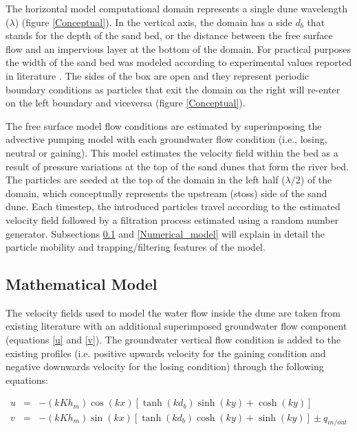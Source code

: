 \documentclass[draft,linenumbers]{agujournal2018}
\begin{document}
The horizontal model computational domain represents a single dune wavelength ($\lambda$) (figure \ref{Conceptual}). In the vertical axis, the domain has a side $d_b$ that stands for the depth of the sand bed, or the distance between the free surface flow and an impervious layer at the bottom of the domain. For practical purposes the width of the sand bed was modeled according to experimental values reported in literature \citep{Fox2014,Fox2018}. The sides of the box are open and they represent periodic boundary conditions as particles that exit the domain on the right will re-enter on the left boundary and viceversa (figure \ref{Conceptual}). 

The free surface model flow conditions are estimated by superimposing the advective pumping model \citep{Elliott1997} with each groundwater flow condition (i.e., losing, neutral or gaining). This model estimates the velocity field within the bed as a result of pressure variations at the top of the sand dunes that form the river bed. The particles are seeded at the top of the domain in the left half ($\lambda / 2$) of the domain, which conceptually represents the upstream (stoss) side of the sand dune. Each timestep, the introduced particles travel according to the estimated velocity field followed by a filtration process estimated using a random number generator. Subsections \ref{Mathematical_model} and \ref{Numerical_model} will explain in detail the particle mobility and trapping/filtering features of the model.

\subsection{Mathematical Model} \label{Mathematical_model}

The velocity fields used to model the water flow inside the dune are taken from existing literature \citep{Elliott1997,Packman2000} with an additional superimposed groundwater flow component  (equations \ref{u} and \ref{v}). The groundwater vertical flow condition is added to the existing profiles (i.e. positive upwards velocity for the gaining condition and negative downwards velocity for the losing condition) through the following equations: 

\begin{eqnarray}
\label{u}
  u & = & -(kKh_{m}) \cos(kx) [\tanh(kd_b)\sinh(ky) + \cosh(ky)] \\
\label{v}
  v & = & -(kKh_{m}) \sin(kx) [\tanh(kd_b)\cosh(ky) + \sinh(ky)] \pm q_{in/out} 
\end{eqnarray}
\end{document}
